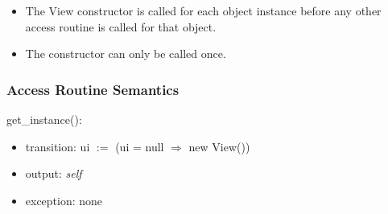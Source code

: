 \documentclass[12pt]{article}
\begin{document}
\begin{itemize}
  \item The View constructor is called for each object instance before any 
  other access routine is called for that object.  
  \item The constructor can only be called once.
\end{itemize}

\subsubsection* {Access Routine Semantics}

\noindent get\_instance():
\begin{itemize}
\item transition: ui $:=$ (ui = null $\Rightarrow$ new View())
\item output: \textit{self}
\item exception: none
\end{itemize}





\end{document}
